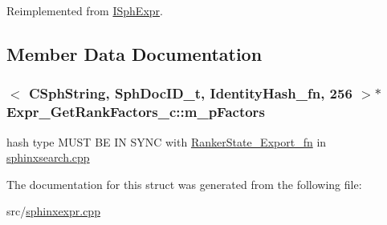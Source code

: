 Reimplemented from \hyperlink{structISphExpr_a5e1268916a46b2b9cabb93d30ca5c40c}{I\-Sph\-Expr}.



\subsection{Member Data Documentation}
\hypertarget{structExpr__GetRankFactors__c_a12dffe8df1dd7b22c864585048281ea2}{
\subsubsection[{m\-\_\-p\-Factors}]{$<$ {\bf C\-Sph\-String}, {\bf Sph\-Doc\-I\-D\-\_\-t}, {\bf Identity\-Hash\-\_\-fn}, 256 $>$$\ast$ Expr\-\_\-\-Get\-Rank\-Factors\-\_\-c\-::m\-\_\-p\-Factors}}\label{structExpr__GetRankFactors__c_a12dffe8df1dd7b22c864585048281ea2}


hash type M\-U\-S\-T B\-E I\-N S\-Y\-N\-C with \hyperlink{structRankerState__Export__fn}{Ranker\-State\-\_\-\-Export\-\_\-fn} in \hyperlink{sphinxsearch_8cpp}{sphinxsearch.\-cpp} 



The documentation for this struct was generated from the following file\-:\begin{DoxyCompactItemize}
\item 
src/\hyperlink{sphinxexpr_8cpp}{sphinxexpr.\-cpp}\end{DoxyCompactItemize}
